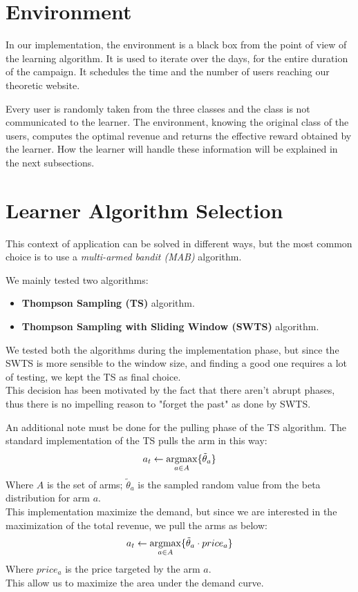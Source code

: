 \section{Environment}

In our implementation, the environment is a black box from the point of view of the learning algorithm.
It is used to iterate over the days, for the entire duration of the campaign.
It schedules the time and the number of users reaching our theoretic website.

Every user is randomly taken from the three classes and the class is not communicated to the learner. The environment, knowing the original class of the users, computes the optimal revenue and returns the effective reward obtained by the learner.
How the learner will handle these information will be explained in the next subsections.


\section{Learner Algorithm Selection}

This context of application can be solved in different ways, but the most common choice is to use a \textit{multi-armed bandit (MAB)} algorithm.

We mainly tested two algorithms:
\begin{itemize}
    \item \textbf{Thompson Sampling (TS)} algorithm.
    \item \textbf{Thompson Sampling with Sliding Window (SWTS)} algorithm.
\end{itemize}

We tested both the algorithms during the implementation phase, but since the SWTS is more sensible to the window size, and finding a good one requires a lot of testing, we kept the TS as final choice.\\
This decision has been motivated by the fact that there aren't abrupt phases, thus there is no impelling reason to "forget the past" as done by SWTS.

An additional note must be done for the pulling phase of the TS algorithm. The standard implementation of the TS pulls the arm in this way:
\begin{equation}
    a_t \leftarrow \operatorname*{argmax}_{a \in A} \{\tilde{\theta}_a\}
\end{equation}
Where $A$ is the set of arms; $\tilde{\theta}_a$  is the sampled random value from the beta distribution for arm $a$.\\
This implementation maximize the demand, but since we are interested in the maximization of the total revenue, we pull the arms as below:
\begin{equation}
    a_t \leftarrow \operatorname*{argmax}_{a \in A} \{\tilde{\theta}_a \cdot price_a\}
\end{equation}
Where $price_a$ is the price targeted by the arm $a$.\\
This allow us to maximize the area under the demand curve.


